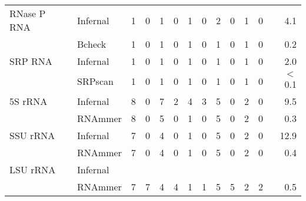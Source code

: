 \begin{table}
\begin{center}
\begin{tabular}{|l|l|rr|rr|rr|rr|rr|r|}
RNase P RNA      &  Infernal         &    1 &   0 &    1 &   0 &    1 &   0 &    2 &   0 &    1 &   0 &     4.1  \\ 
                 &  Bcheck           &    1 &   0 &    1 &   0 &    1 &   0 &    1 &   0 &    1 &   0 &     0.2  \\ \hline 
SRP RNA          &  Infernal         &    1 &   0 &    1 &   0 &    1 &   0 &    1 &   0 &    1 &   0 &     2.0  \\ 
                 &  SRPscan          &    1 &   0 &    1 &   0 &    1 &   0 &    1 &   0 &    1 &   0 &  $<$0.1  \\ \hline 
5S rRNA          &  Infernal         &    8 &   0 &    7 &   2 &    4 &   3 &    5 &   0 &    2 &   0 &     9.5  \\ 
                 &  RNAmmer          &    8 &   0 &    5 &   0 &    1 &   0 &    5 &   0 &    2 &   0 &     0.3  \\ \hline 
SSU rRNA         &  Infernal         &    7 &   0 &    4 &   0 &    1 &   0 &    5 &   0 &    2 &   0 &    12.9  \\ 
                 &  RNAmmer          &    7 &   0 &    4 &   0 &    1 &   0 &    5 &   0 &    2 &   0 &     0.4  \\ \hline 
LSU rRNA         &  Infernal         &      &     &      &     &      &     &      &     &      &     &          \\ 
                 &  RNAmmer          &    7 &   7 &    4 &   4 &    1 &   1 &    5 &   5 &    2 &   2 &     0.5  \\ \hline 
\end{tabular}
\end{center}

\label{tbl:compare-bac}
\end{table}


